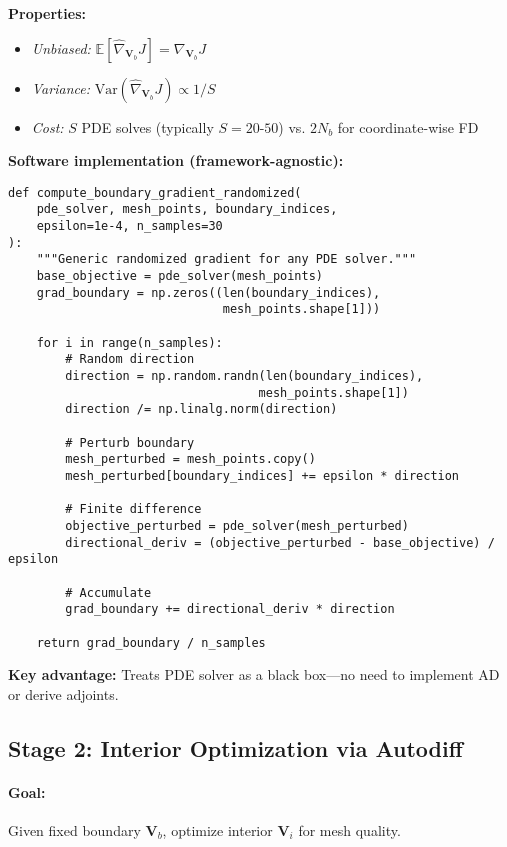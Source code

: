 \documentclass{article}
\begin{document}
\textbf{Properties:}
\begin{itemize}
    \item \emph{Unbiased:} $\mathbb{E}[\hat{\nabla}_{\mathbf{V}_b} J] = \nabla_{\mathbf{V}_b} J$
    \item \emph{Variance:} $\text{Var}(\hat{\nabla}_{\mathbf{V}_b} J) \propto 1/S$
    \item \emph{Cost:} $S$ PDE solves (typically $S = 20$-$50$) vs. $2N_b$ for coordinate-wise FD
\end{itemize}

\textbf{Software implementation (framework-agnostic):}
\begin{verbatim}
def compute_boundary_gradient_randomized(
    pde_solver, mesh_points, boundary_indices,
    epsilon=1e-4, n_samples=30
):
    """Generic randomized gradient for any PDE solver."""
    base_objective = pde_solver(mesh_points)
    grad_boundary = np.zeros((len(boundary_indices),
                              mesh_points.shape[1]))

    for i in range(n_samples):
        # Random direction
        direction = np.random.randn(len(boundary_indices),
                                   mesh_points.shape[1])
        direction /= np.linalg.norm(direction)

        # Perturb boundary
        mesh_perturbed = mesh_points.copy()
        mesh_perturbed[boundary_indices] += epsilon * direction

        # Finite difference
        objective_perturbed = pde_solver(mesh_perturbed)
        directional_deriv = (objective_perturbed - base_objective) / epsilon

        # Accumulate
        grad_boundary += directional_deriv * direction

    return grad_boundary / n_samples
\end{verbatim}

\textbf{Key advantage:} Treats PDE solver as a black box—no need to implement AD or derive adjoints.

\subsection{Stage 2: Interior Optimization via Autodiff}

\paragraph{Goal:} Given fixed boundary $\mathbf{V}_b$, optimize interior $\mathbf{V}_i$ for mesh quality.
\end{document}
